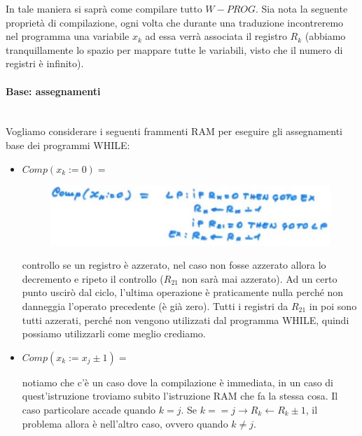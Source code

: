 \documentclass{article}
\begin{document}
In tale maniera si saprà come compilare tutto $W-PROG$. Sia nota la seguente proprietà di compilazione,
ogni volta che durante una traduzione incontreremo nel programma una variabile $x_k$ ad essa verrà
associata il registro $R_k$ (abbiamo tranquillamente lo spazio per mappare tutte le variabili, visto
che il numero di registri è infinito).

\paragraph{Base: assegnamenti}\mbox{}\\
Vogliamo considerare i seguenti frammenti RAM per eseguire gli assegnamenti base dei programmi WHILE:
\begin{itemize}
    \item $Comp(x_k:=0)=$
          \begin{figure}[H]
              \centering
              \includegraphics[scale=0.4]{images/assegnamento_ram.png}
          \end{figure}
          controllo se un registro è azzerato, nel caso non fosse azzerato allora lo decremento
          e ripeto il controllo ($R_21$ non sarà mai azzerato). Ad un certo punto uscirò dal ciclo,
          l'ultima operazione è praticamente nulla perché non danneggia l'operato precedente (è già zero).
          Tutti i registri da $R_21$ in poi sono tutti azzerati, perché non vengono utilizzati dal programma
          WHILE, quindi possiamo utilizzarli come meglio crediamo.

    \item $Comp(x_k:=x_j\pm 1)=$

          notiamo che c'è un caso dove la compilazione è immediata, in un caso di quest'istruzione
          troviamo subito l'istruzione RAM che fa la stessa cosa. Il caso particolare accade quando
          $k=j$. Se $k==j\rightarrow R_k\leftarrow R_k\pm 1$, il problema allora è nell'altro caso,
          ovvero quando $k\neq j$.


\end{itemize}
\end{document}
